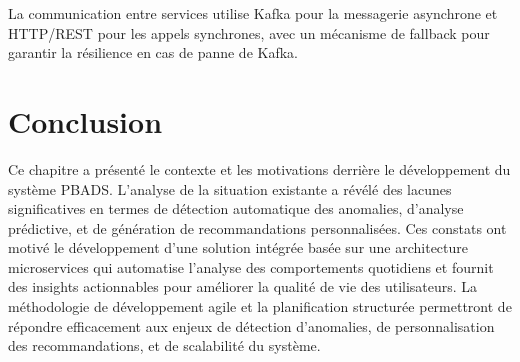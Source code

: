 La communication entre services utilise Kafka pour la messagerie asynchrone et HTTP/REST pour les appels synchrones, avec un mécanisme de fallback pour garantir la résilience en cas de panne de Kafka.

\section{Conclusion}
Ce chapitre a présenté le contexte et les motivations derrière le développement du système PBADS. L'analyse de la situation existante a révélé des lacunes significatives en termes de détection automatique des anomalies, d'analyse prédictive, et de génération de recommandations personnalisées. Ces constats ont motivé le développement d'une solution intégrée basée sur une architecture microservices qui automatise l'analyse des comportements quotidiens et fournit des insights actionnables pour améliorer la qualité de vie des utilisateurs. La méthodologie de développement agile et la planification structurée permettront de répondre efficacement aux enjeux de détection d'anomalies, de personnalisation des recommandations, et de scalabilité du système.
